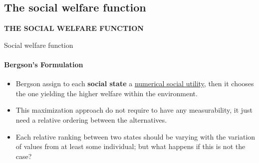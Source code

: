 \documentclass{beamer}
\begin{document}
\subsection{The social welfare function}

\begin{frame}
    \vfill
    \begin{center}
        \LARGE \textbf{THE SOCIAL WELFARE FUNCTION} \\ 
    \end{center}
    \vfill
\end{frame}

\begin{frame}{Social welfare function}
    \framesubtitle{Bergson's Formulation}
    \begin{itemize}
        \item[$\Rightarrow$] Bergson assign to each \textbf{social state} a \underline{numerical social utility}, then it chooses the one yielding the higher welfare within the environment.
        \vspace{0.75 cm}
        \item This maximization approach do not require to have any measurability, it just need a relative ordering between the alternatives.
        \vspace{0.25 cm}
        \item Each relative ranking between two states should be varying with the variation of values from at least some individual; but what happens if this is not the case?  
    \end{itemize}

\end{frame}
\end{document}
